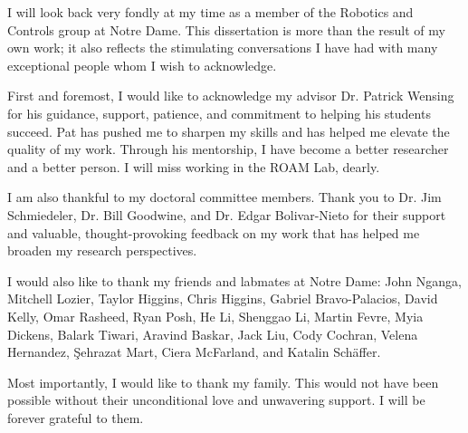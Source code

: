 \begin{acknowledge}
	I will look back very fondly at my time as a member of the Robotics and Controls group at Notre Dame. This dissertation is more than the result of my own work; it also reflects the stimulating conversations I have had with many exceptional people whom I wish to acknowledge.
	
	First and foremost, I would like to acknowledge my advisor Dr. Patrick Wensing for his guidance, support, patience, and commitment to helping his students succeed. Pat has pushed me to sharpen my skills and has helped me elevate the quality of my work. Through his mentorship, I have become a better researcher and a better person. I will miss working in the ROAM Lab, dearly.
	
	I am also thankful to my doctoral committee members. Thank you to Dr. Jim Schmiedeler, Dr. Bill Goodwine, and Dr. Edgar Bolivar-Nieto for their support and valuable, thought-provoking feedback on my work that has helped me broaden my research perspectives. 
	
	I would also like to thank my friends and labmates at Notre Dame: John Nganga, Mitchell Lozier, Taylor Higgins, Chris Higgins, Gabriel Bravo-Palacios, David Kelly, Omar Rasheed, Ryan Posh, He Li, Shenggao Li, Martin Fevre, Myia Dickens, Balark Tiwari, Aravind Baskar, Jack Liu, Cody Cochran, Velena Hernandez, {\c S}ehrazat Mart, Ciera McFarland, and Katalin Sch{\"a}ffer. 
	
	Most importantly, I would like to thank my family. This would not have been possible without their unconditional love and unwavering support. I will be forever grateful to them.
\end{acknowledge}